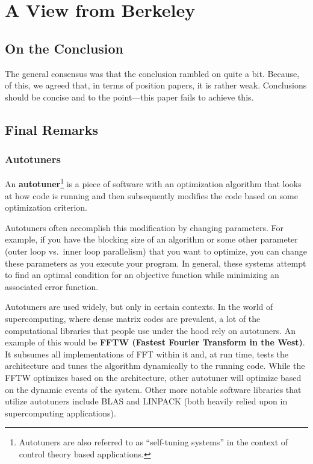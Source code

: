 



\section{A View from Berkeley}

\subsection{On the Conclusion}

The general consensus was that the conclusion rambled on quite a bit. Because, of this, we agreed that, in terms of position papers, it is rather weak. Conclusions should be concise and to the point---this paper fails to achieve this.

\subsection{Final Remarks}

\subsubsection{Autotuners}

An \textbf{autotuner}\footnote{Autotuners are also referred to as ``self-tuning systems'' in the context of control theory based applications.} is a piece of software with an optimization algorithm that looks at how code is running and then subsequently modifies the code based on some optimization criterion.

Autotuners often accomplish this modification by changing parameters. For example, if you have the blocking size of an algorithm or some other parameter (outer loop vs.\ inner loop parallelism) that you want to optimize, you can change these parameters as you execute your program. In general, these systems attempt to find an optimal condition for an objective function while minimizing an associated error function.

Autotuners are used widely, but only in certain contexts. In the world of supercomputing, where dense matrix codes are prevalent, a lot of the computational libraries that people use under the hood rely on autotuners. An example of this would be \textbf{FFTW (Fastest Fourier Transform in the West)}. It subsumes all implementations of FFT within it and, at run time, tests the architecture and tunes the algorithm dynamically to the running code. While the FFTW optimizes based on the architecture, other autotuner will optimize based on the dynamic events of the system. Other more notable software libraries that utilize autotuners include BLAS and LINPACK (both heavily relied upon in supercomputing applications).

